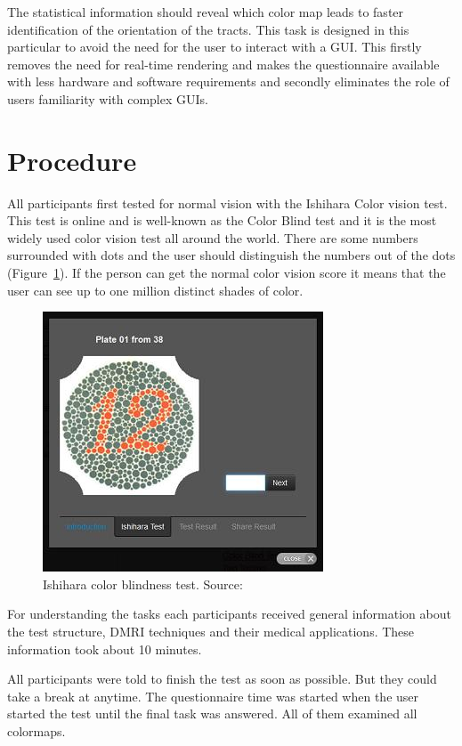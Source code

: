 \documentclass[hyperref, plainreport, noproblem]{cgvpub1}
\begin{document}
\begin{itemize}
The statistical information should reveal which color map leads to faster identification of the orientation of the tracts. This task is designed in this particular to avoid the need for the user to interact with a GUI. This firstly removes the need for real-time rendering and makes the questionnaire available with less hardware and software requirements and secondly eliminates the role of users familiarity with complex GUIs.


\end{itemize}

\section{Procedure}
\label{procedure}
All participants first tested for normal vision with the Ishihara Color vision test. This test is online and is well-known as the Color Blind test and it is the most widely used color vision test all around the world. There are some numbers surrounded with dots and the user should distinguish the numbers out of the dots (Figure~\ref{fig:Ishihara}). If the person can get the normal color vision score it means that the user can see up to one million distinct shades of color.
\begin{figure}[ht]
    \centering
    \includegraphics[width = 0.6\columnwidth]{Ishihara}
    \caption{Ishihara color blindness test. Source:  \cite{www.color-blindness.com}}
    \label{fig:Ishihara}
\end{figure}

For understanding the tasks each participants received general information about the test structure, DMRI techniques and their medical applications. These information took about 10 minutes. 

All participants were told to finish the test as soon as possible. But they could take a break at anytime. The questionnaire time was started when the user started the test until the final task was answered. 
All of them examined all colormaps.
\end{document}
